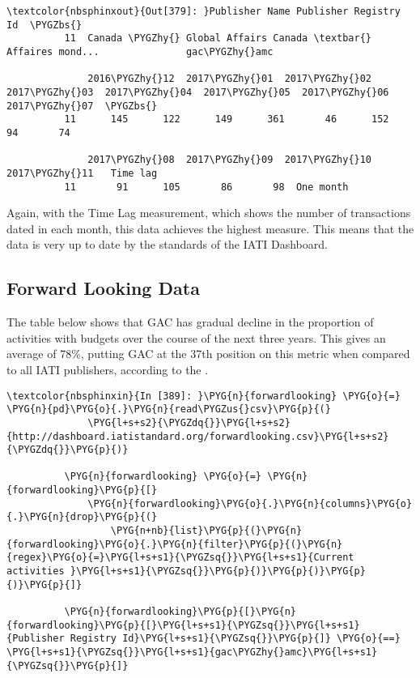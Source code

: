 \documentclass[letterpaper,10pt,english]{sphinxmanual}
\begin{document}
\begin{Verbatim}[commandchars=\\\{\}]
\textcolor{nbsphinxout}{Out[379]: }Publisher Name Publisher Registry Id  \PYGZbs{}
          11  Canada \PYGZhy{} Global Affairs Canada \textbar{} Affaires mond...               gac\PYGZhy{}amc
          
              2016\PYGZhy{}12  2017\PYGZhy{}01  2017\PYGZhy{}02  2017\PYGZhy{}03  2017\PYGZhy{}04  2017\PYGZhy{}05  2017\PYGZhy{}06  2017\PYGZhy{}07  \PYGZbs{}
          11      145      122      149      361       46      152       94       74
          
              2017\PYGZhy{}08  2017\PYGZhy{}09  2017\PYGZhy{}10  2017\PYGZhy{}11   Time lag
          11       91      105       86       98  One month
\end{Verbatim}

Again, with the Time Lag measurement, which shows the number of
transactions dated in each month, this data achieves the highest
measure. This means that the data is very up to date by the standards of
the IATI Dashboard.


\subsection{Forward Looking Data}
\label{\detokenize{Global Affairs Canada - Compliance Report:Forward-Looking-Data}}
The table below shows that GAC has gradual decline in the proportion of
activities with budgets over the course of the next three years. This
gives an average of 78\%, putting GAC at the 37th position on this metric
when compared to all IATI publishers, according to the .

\begin{Verbatim}[commandchars=\\\{\}]
\textcolor{nbsphinxin}{In [389]: }\PYG{n}{forwardlooking} \PYG{o}{=} \PYG{n}{pd}\PYG{o}{.}\PYG{n}{read\PYGZus{}csv}\PYG{p}{(}
              \PYG{l+s+s2}{\PYGZdq{}}\PYG{l+s+s2}{http://dashboard.iatistandard.org/forwardlooking.csv}\PYG{l+s+s2}{\PYGZdq{}}\PYG{p}{)}
          
          \PYG{n}{forwardlooking} \PYG{o}{=} \PYG{n}{forwardlooking}\PYG{p}{[}
              \PYG{n}{forwardlooking}\PYG{o}{.}\PYG{n}{columns}\PYG{o}{.}\PYG{n}{drop}\PYG{p}{(}
                  \PYG{n+nb}{list}\PYG{p}{(}\PYG{n}{forwardlooking}\PYG{o}{.}\PYG{n}{filter}\PYG{p}{(}\PYG{n}{regex}\PYG{o}{=}\PYG{l+s+s1}{\PYGZsq{}}\PYG{l+s+s1}{Current activities }\PYG{l+s+s1}{\PYGZsq{}}\PYG{p}{)}\PYG{p}{)}\PYG{p}{)}\PYG{p}{]}
          
          \PYG{n}{forwardlooking}\PYG{p}{[}\PYG{n}{forwardlooking}\PYG{p}{[}\PYG{l+s+s1}{\PYGZsq{}}\PYG{l+s+s1}{Publisher Registry Id}\PYG{l+s+s1}{\PYGZsq{}}\PYG{p}{]} \PYG{o}{==} \PYG{l+s+s1}{\PYGZsq{}}\PYG{l+s+s1}{gac\PYGZhy{}amc}\PYG{l+s+s1}{\PYGZsq{}}\PYG{p}{]}
\end{Verbatim}
\end{document}
